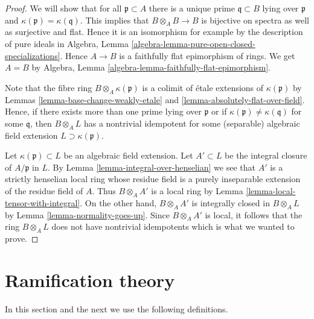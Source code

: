 \begin{proof}
We will show that for all $\mathfrak p \subset A$ there is a unique
prime $\mathfrak q \subset B$ lying over $\mathfrak p$ and
$\kappa(\mathfrak p) = \kappa(\mathfrak q)$.
This implies that $B \otimes_A B \to B$ is bijective on spectra
as well as surjective and flat. Hence it is an isomorphism
for example by the description of pure ideals in
Algebra, Lemma \ref{algebra-lemma-pure-open-closed-specializations}.
Hence $A \to B$ is a faithfully flat epimorphism of rings. We get
$A = B$ by
Algebra, Lemma \ref{algebra-lemma-faithfully-flat-epimorphism}.

\medskip\noindent
Note that the fibre ring $B \otimes_A \kappa(\mathfrak p)$
is a colimit of \'etale extensions of $\kappa(\mathfrak p)$ by
Lemmas \ref{lemma-base-change-weakly-etale} and
\ref{lemma-absolutely-flat-over-field}.
Hence, if there exists more than one prime lying over $\mathfrak p$
or if $\kappa(\mathfrak p) \not = \kappa(\mathfrak q)$ for some $\mathfrak q$,
then $B \otimes_A L$ has a nontrivial idempotent for some (separable)
algebraic field extension $L \supset \kappa(\mathfrak p)$.

\medskip\noindent
Let $\kappa(\mathfrak p) \subset L$ be an algebraic field extension.
Let $A' \subset L$ be the integral closure of $A/\mathfrak p$ in $L$.
By Lemma \ref{lemma-integral-over-henselian}
we see that $A'$ is a strictly henselian local ring
whose residue field is a purely inseparable extension of the residue
field of $A$. Thus $B \otimes_A A'$ is a local ring by
Lemma \ref{lemma-local-tensor-with-integral}.
On the other hand, $B \otimes_A A'$ is integrally closed in
$B \otimes_A L$ by Lemma \ref{lemma-normality-goes-up}.
Since $B \otimes_A A'$ is local, it follows that the ring
$B \otimes_A L$ does not have nontrivial
idempotents which is what we wanted to prove.
\end{proof}











\section{Ramification theory}
\label{section-ramification}


\noindent
In this section and the next we use the following definitions.

